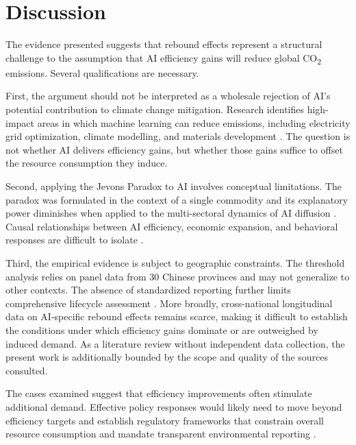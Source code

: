 \section{Discussion}
\label{sec:discussion}

The evidence presented suggests that rebound effects represent
a structural challenge to the assumption that AI efficiency
gains will reduce global CO\textsubscript{2} emissions.
Several qualifications are necessary.

First, the argument should not be interpreted as a wholesale
rejection of AI's potential contribution to climate change
mitigation. Research identifies high-impact areas in which
machine learning can reduce emissions, including electricity
grid optimization, climate modelling, and materials development
\cite{rolnick2022}. The question is not whether AI delivers
efficiency gains, but whether those gains suffice to offset
the resource consumption they induce.

Second, applying the Jevons Paradox to AI involves conceptual
limitations. The paradox was formulated in the context of a
single commodity and its explanatory power diminishes when
applied to the multi-sectoral dynamics of AI diffusion
\cite{luccioni2025}. Causal relationships between AI
efficiency, economic expansion, and behavioral responses are
difficult to isolate \cite{luccioni2025}.

Third, the empirical evidence is subject to geographic
constraints. The threshold analysis relies on panel data from
30 Chinese provinces \cite{chen2025} and may not generalize to
other contexts. The absence of standardized reporting further
limits comprehensive lifecycle assessment \cite{luccioni2025}.
More broadly, cross-national longitudinal data on AI-specific
rebound effects remains scarce, making it difficult to establish
the conditions under which efficiency gains dominate or are
outweighed by induced demand. As a literature review without
independent data collection, the present work is additionally
bounded by the scope and quality of the sources consulted.

The cases examined suggest that efficiency improvements often
stimulate additional demand. Effective policy responses would
likely need to move beyond efficiency targets and establish
regulatory frameworks that constrain overall resource
consumption and mandate transparent environmental reporting
\cite{luccioni2025,widdicks2023}.
